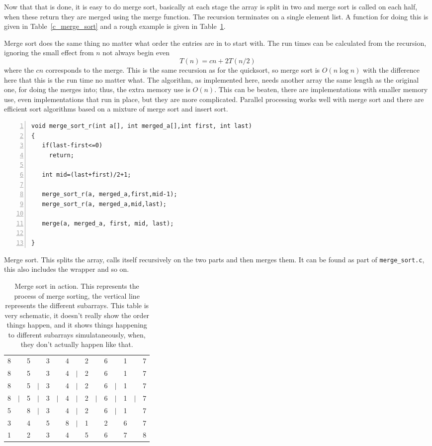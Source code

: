 \documentclass[11pt,a4paper]{scrartcl}
\begin{document}
Now that that is done, it is easy to do merge sort, basically at each
stage the array is split in two and merge sort is called on each half,
when these return they are merged using the merge function. The
recursion terminates on a single element list. A function for doing
this is given in Table~\ref{c_merge_sort} and a rough example is given
in Table~\ref{table_merge_sort}.

Merge sort does the same thing no matter what order the entries are in
to start with. The run times can be calculated from the recursion,
ignoring the small effect from $n$ not always begin even
\begin{equation}
T(n)=cn+2T(n/2)
\end{equation}
where the $cn$ corresponds to the merge. This is the same recursion as
for the quicksort, so merge sort is $O(n\log{n})$ with the difference
here that this is the run time no matter what. The algorithm, as
implemented here, needs another array the same length as the original
one, for doing the merges into; thus, the extra memory use is
$O(n)$. This can be beaten, there are implementations with smaller
memory use, even implementations that run in place, but they are more
complicated. Parallel processing works well with merge sort and there
are efficient sort algorithms based on a mixture of merge sort and
insert sort.

\begin{table}
\begin{lstlisting}[numbers=left]
void merge_sort_r(int a[], int merged_a[],int first, int last)
{
   if(last-first<=0)
     return;

   int mid=(last+first)/2+1;

   merge_sort_r(a, merged_a,first,mid-1);
   merge_sort_r(a, merged_a,mid,last);

   merge(a, merged_a, first, mid, last);

}
\end{lstlisting}
\caption{Merge sort. This splits the array, calls itself recursively
  on the two parts and then merges them. It can be found as part of
  {\tt merge\_sort.c}, this also includes the wrapper and so
  on. \label{c_merge_sort}}
\end{table}


\begin{table}
\begin{tabular}{ccccccccccccccc}
8&&5&&3&&4&&2&&6&&1&&7\\
8&&5&&3&&4&$|$&2&&6&&1&&7\\
8&&5&$|$&3&&4&$|$&2&&6&$|$&1&&7\\
8&$|$&5&$|$&3&$|$&4&$|$&2&$|$&6&$|$&1&$|$&7\\
5&&8&$|$&3&&4&$|$&2&&6&$|$&1&&7\\
3&&4&&5&&8&$|$&1&&2&&6&&7\\
1&&2&&3&&4&&5&&6&&7&&8
\end{tabular}
\caption{Merge sort in action. This represents the process of merge
  sorting, the vertical line represents the different subarrays. This
  table is very schematic, it doesn't really show the order things
  happen, and it shows things happening to different subarrays
  simulataneously, when, they don't actually happen like
  that.\label{table_merge_sort}}
\end{table}
\end{document}
